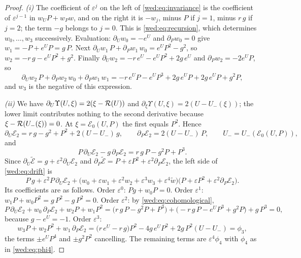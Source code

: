 \begin{proof}
\emph{(i)} The coefficient of $\varepsilon^j$ on the left of \eqref{wed:eq:invariance} is the coefficient of $\varepsilon^{j-1}$ in $w_UP+w_Pw$, and on the right it is $-w_j$, minus $P$ if $j=1$, minus $r\,g$ if $j=2$; the term $-g$ belongs to $j=0$. This is \eqref{wed:eq:recursion}, which determines $w_0,\dots,w_3$ successively. Evaluation: $\partial_Uw_0=-e^U$ and $\partial_Pw_0=0$ give $w_1=-P+e^UP=g\,P$. Next $\partial_Uw_1\,P+\partial_Pw_1\,w_0=e^UP^2-g^2$, so $w_2=-r\,g-e^UP^2+g^2$. Finally $\partial_Uw_2=-r\,e^U-e^UP^2+2g\,e^U$ and $\partial_Pw_2=-2e^UP$, so
\[
\partial_Uw_2\,P+\partial_Pw_2\,w_0+\partial_Pw_1\,w_1=-r\,e^UP-e^UP^3+2g\,e^UP+2g\,e^UP+g^2P,
\]
and $w_3$ is the negative of this expression.

\emph{(ii)} We have $\partial_U\Upsilon(U,\xi)=2(\xi-\mathcal R(U))$ and $\partial_\xi\Upsilon(U,\xi)=2(U-U_-(\xi))$; the lower limit contributes nothing to the second derivative because $\xi-\mathcal R(U_-(\xi))=0$. At $\xi=\mathcal E_0(U,P)$ the first equals $P^2$. Hence
\[
\partial_U\mathcal E_2=r\,g-g^2+P^2+2(U-U_-)\,g,\qquad \partial_P\mathcal E_2=2(U-U_-)\,P,\qquad U_-=U_-(\mathcal E_0(U,P)),
\]
and
\begin{equation}\label{wed:eq:cohomological}
P\,\partial_U\mathcal E_2-g\,\partial_P\mathcal E_2=r\,g\,P-g^2P+P^3 .
\end{equation}
Since $\partial_U\tilde{\mathcal E}=g+\varepsilon^2\partial_U\mathcal E_2$ and $\partial_P\tilde{\mathcal E}=P+\varepsilon P^2+\varepsilon^2\partial_P\mathcal E_2$, the left side of \eqref{wed:eq:drift} is
\[
P\,g+\varepsilon^2P\,\partial_U\mathcal E_2+\bigl(w_0+\varepsilon w_1+\varepsilon^2w_2+\varepsilon^3w_3+\varepsilon^4\tilde w\bigr)\bigl(P+\varepsilon P^2+\varepsilon^2\partial_P\mathcal E_2\bigr).
\]
Its coefficients are as follows. Order $\varepsilon^0$: $Pg+w_0P=0$. Order $\varepsilon^1$: $w_1P+w_0P^2=g\,P^2-g\,P^2=0$. Order $\varepsilon^2$: by \eqref{wed:eq:cohomological},
\[
P\,\partial_U\mathcal E_2+w_0\,\partial_P\mathcal E_2+w_2P+w_1P^2
=\bigl(r\,g\,P-g^2P+P^3\bigr)+\bigl(-r\,g\,P-e^UP^3+g^2P\bigr)+g\,P^3=0,
\]
because $g-e^U=-1$. Order $\varepsilon^3$:
\[
w_3P+w_2P^2+w_1\,\partial_P\mathcal E_2
=\bigl(r\,e^U-r\,g\bigr)P^2-4g\,e^UP^2+2g\,P^2(U-U_-)=\phi_3 ,
\]
the terms $\pm e^UP^4$ and $\pm g^2P^2$ cancelling. The remaining terms are $\varepsilon^4\phi_4$ with $\phi_4$ as in \eqref{wed:eq:phi4}.


\end{proof}
